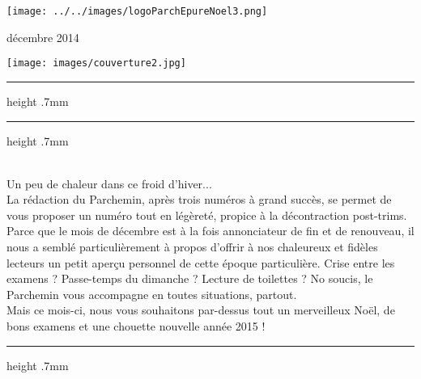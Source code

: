 
\usepackage{rotating} 
\usepackage{calc}

\renewcommand*{\hrulefill}[1][0.3mm]{\leavevmode \leaders \hrule height #1 \hfill \kern 0pt}


\thispagestyle{empty}
\begin{center}
\vspace*{-4.2cm}\hspace*{-5mm}\texttt{[image: ../../images/logoParchEpureNoel3.png]}
\begin{flushright}{\selectfont\vspace*{-1cm}décembre 2014}\hspace*{4mm}\end{flushright}
\vspace*{-10mm}
\vspace*{1mm}
\end{center}
\begin{center}
\begin{minipage}[c]{\textwidth}
\vspace*{-1.4cm}\texttt{[image: images/couverture2.jpg]}
\end{minipage}\hspace*{0.7mm}
\end{center}
\vspace*{-.9cm}
\begin{center}
\hrulefill[.7mm]\hspace*{2mm}\hrulefill[.7mm]
\end{center}
\vspace*{-4mm}\begin{multicols}{3}
\vspace*{-.9cm}\\[.4mm]
Un peu de chaleur dans ce froid d’hiver...\\
La rédaction du Parchemin, après trois numéros à grand succès, se permet de vous
proposer un numéro tout en légèreté, propice à la décontraction post-trims. Parce que le mois de décembre est à la fois annonciateur de fin et de renouveau, il nous a semblé particulièrement à propos d’offrir à nos chaleureux et fidèles lecteurs un petit aperçu personnel de cette époque particulière. Crise entre les examens ? Passe-temps du dimanche ? Lecture de toilettes ? No soucis, le Parchemin vous accompagne en toutes situations, partout.\\
Mais ce mois-ci, nous vous souhaitons par-dessus tout un merveilleux Noël, de bons examens et une chouette nouvelle année 2015 !\quad{}
\end{multicols}\vspace*{-1cm}\hrulefill[.7mm]

